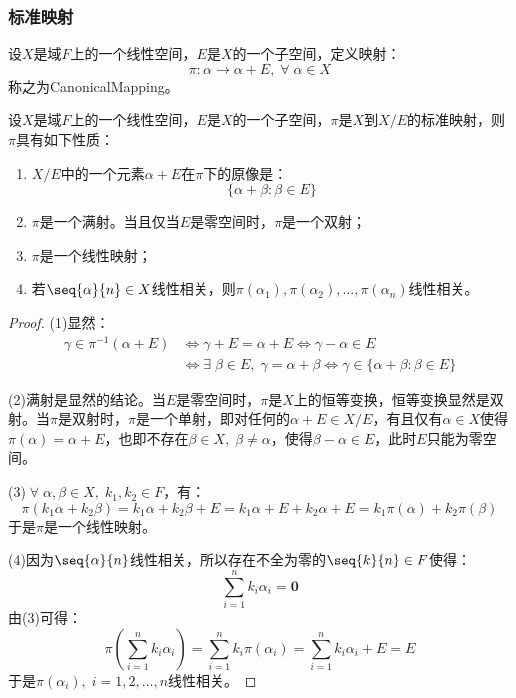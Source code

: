 \subsubsection{标准映射}
\begin{definition}
	设$X$是域$F$上的一个线性空间，$E$是$X$的一个子空间，定义映射：
	\begin{equation*}
		\pi:\alpha\longrightarrow\alpha+E,\;\forall\;\alpha\in X
	\end{equation*}
	称之为\gls{CanonicalMapping}。
\end{definition}
\begin{property}\label{prop:CanonicalMap}
	设$X$是域$F$上的一个线性空间，$E$是$X$的一个子空间，$\pi$是$X$到$X/E$的标准映射，则$\pi$具有如下性质：
	\begin{enumerate}
		\item $X/E$中的一个元素$\alpha+E$在$\pi$下的原像是：
		\begin{equation*}
			\{\alpha+\beta:\beta\in E\}
		\end{equation*}
		\item $\pi$是一个满射。当且仅当$E$是零空间时，$\pi$是一个双射；
		\item $\pi$是一个线性映射；
		\item 若$\seq{\alpha}{n}\in X$线性相关，则$\pi(\alpha_1),\pi(\alpha_2),\dots,\pi(\alpha_n)$线性相关。
	\end{enumerate}
\end{property}
\begin{proof}
	(1)显然：
	\begin{align*}
		\gamma\in\pi^{-1}(\alpha+E)
		&\iff
		\gamma+E=\alpha+E
		\iff
		\gamma-\alpha\in E \\
		&\iff
		\exists\;\beta\in E,\;\gamma=\alpha+\beta
		\iff
		\gamma\in\{\alpha+\beta:\beta\in E\}
	\end{align*}\par
	(2)满射是显然的结论。当$E$是零空间时，$\pi$是$X$上的恒等变换，恒等变换显然是双射。当$\pi$是双射时，$\pi$是一个单射，即对任何的$\alpha+E\in X/E$，有且仅有$\alpha\in X$使得$\pi(\alpha)=\alpha+E$，也即不存在$\beta\in X,\;\beta\ne\alpha$，使得$\beta-\alpha\in E$，此时$E$只能为零空间。\par
	(3)$\;\forall\;\alpha,\beta\in X,\;k_1,k_2\in F$，有：
	\begin{equation*}
		\pi(k_1\alpha+k_2\beta)=k_1\alpha+k_2\beta+E=k_1\alpha+E+k_2\alpha+E=k_1\pi(\alpha)+k_2\pi(\beta)
	\end{equation*}
	于是$\pi$是一个线性映射。\par
	(4)因为$\seq{\alpha}{n}$线性相关，所以存在不全为零的$\seq{k}{n}\in F$使得：
	\begin{equation*}
		\sum_{i=1}^{n}k_i\alpha_i=\mathbf{0}
	\end{equation*}
	由(3)可得：
	\begin{equation*}
		\pi\left(\sum_{i=1}^{n}k_i\alpha_i\right)=\sum_{i=1}^{n}k_i\pi(\alpha_i)=\sum_{i=1}^{n}k_i\alpha_i+E=E
	\end{equation*}
	于是$\pi(\alpha_i),\;i=1,2,\dots,n$线性相关。
\end{proof}
